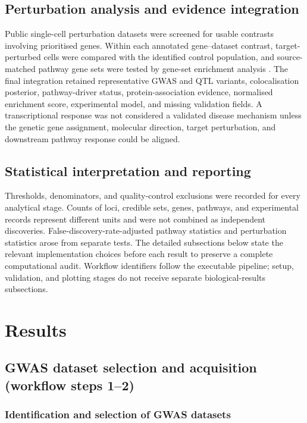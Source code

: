 \documentclass[11pt,a4paper]{article}
\begin{document}
\subsection{Perturbation analysis and evidence integration}

Public single-cell perturbation datasets were screened for usable contrasts involving prioritised genes. Within each annotated gene--dataset contrast, target-perturbed cells were compared with the identified control population, and source-matched pathway gene sets were tested by gene-set enrichment analysis \cite{Subramanian2005GSEA,Peidli2024scPerturb}. The final integration retained representative GWAS and QTL variants, colocalisation posterior, pathway-driver status, protein-association evidence, normalised enrichment score, experimental model, and missing validation fields. A transcriptional response was not considered a validated disease mechanism unless the genetic gene assignment, molecular direction, target perturbation, and downstream pathway response could be aligned.

\subsection{Statistical interpretation and reporting}

Thresholds, denominators, and quality-control exclusions were recorded for every analytical stage. Counts of loci, credible sets, genes, pathways, and experimental records represent different units and were not combined as independent discoveries. False-discovery-rate-adjusted pathway statistics and perturbation statistics arose from separate tests. The detailed subsections below state the relevant implementation choices before each result to preserve a complete computational audit. Workflow identifiers follow the executable pipeline; setup, validation, and plotting stages do not receive separate biological-results subsections.

\section{Results}
\label{sec:results}

\subsection{GWAS dataset selection and acquisition (workflow steps 1--2)}
\label{sec:gwas_download}

\subsubsection{Identification and selection of GWAS datasets}
\end{document}
